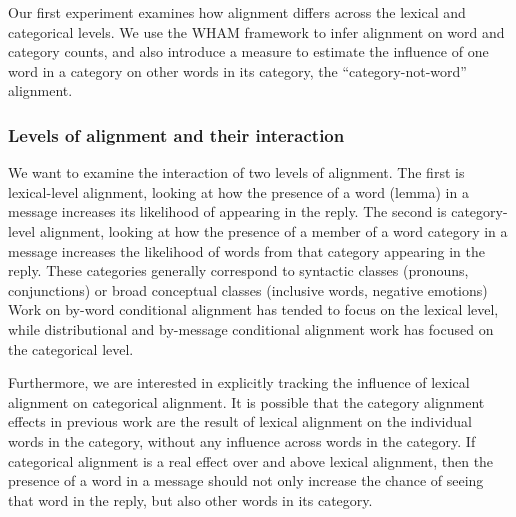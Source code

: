 \documentclass[11pt]{article}
\begin{document}
Our first experiment examines how alignment differs across the lexical and categorical levels. We use the WHAM framework to infer alignment on word and category counts, and also introduce a measure to estimate the influence of one word in a category on other words in its category, the ``category-not-word'' alignment.

\subsubsection{Levels of alignment and their interaction}

We want to examine the interaction of two levels of alignment. The first is lexical-level alignment, looking at how the presence of a word (lemma) in a message increases its likelihood of appearing in the reply.  The second is category-level alignment, looking at how the presence of a member of a word category in a message increases the likelihood of words from that category appearing in the reply.  These categories generally correspond to syntactic classes (pronouns, conjunctions) or broad conceptual classes (inclusive words, negative emotions)   Work on by-word conditional alignment has tended to focus on the lexical level, while distributional and by-message conditional alignment work has focused on the categorical level.


Furthermore, we are interested in explicitly tracking the influence of lexical alignment on categorical alignment.  It is possible that the category alignment effects in previous work are the result of lexical alignment on the individual words in the category, without any influence across words in the category. If categorical alignment is a real effect over and above lexical alignment, then the presence of a word in a message should not only increase the chance of seeing that word in the reply, but also other words in its category.
\end{document}
